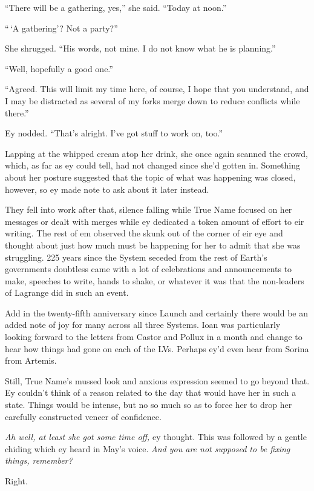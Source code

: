 ``There will be a gathering, yes,'' she said. ``Today at noon.''

``\,`A gathering'? Not a party?''

She shrugged. ``His words, not mine. I do not know what he is planning.''

``Well, hopefully a good one.''

``Agreed. This will limit my time here, of course, I hope that you understand, and I may be distracted as several of my forks merge down to reduce conflicts while there.''

Ey nodded. ``That's alright. I've got stuff to work on, too.''

Lapping at the whipped cream atop her drink, she once again scanned the crowd, which, as far as ey could tell, had not changed since she'd gotten in. Something about her posture suggested that the topic of what was happening was closed, however, so ey made note to ask about it later instead.

They fell into work after that, silence falling while True Name focused on her messages or dealt with merges while ey dedicated a token amount of effort to eir writing. The rest of em observed the skunk out of the corner of eir eye and thought about just how much must be happening for her to admit that she was struggling. 225 years since the System seceded from the rest of Earth's governments doubtless came with a lot of celebrations and announcements to make, speeches to write, hands to shake, or whatever it was that the non-leaders of Lagrange did in such an event.

Add in the twenty-fifth anniversary since Launch and certainly there would be an added note of joy for many across all three Systems. Ioan was particularly looking forward to the letters from Castor and Pollux in a month and change to hear how things had gone on each of the LVs. Perhaps ey'd even hear from Sorina from Artemis.

Still, True Name's mussed look and anxious expression seemed to go beyond that. Ey couldn't think of a reason related to the day that would have her in such a state. Things would be intense, but no so much so as to force her to drop her carefully constructed veneer of confidence.

\emph{Ah well, at least she got some time off,} ey thought. This was followed by a gentle chiding which ey heard in May's voice. \emph{And you are not supposed to be fixing things, remember?}

Right.

